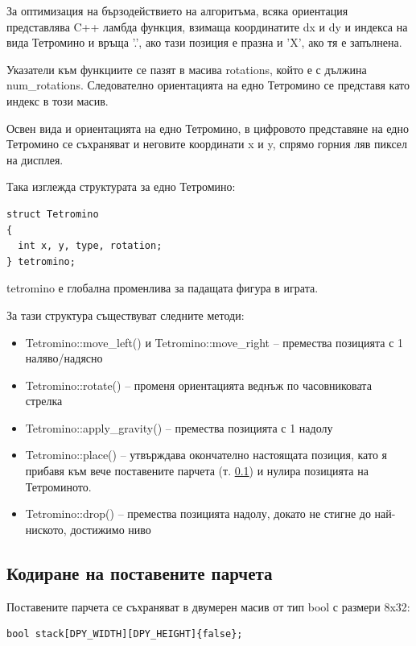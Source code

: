 \documentclass[titlepage, oneside, 14pt]{extbook}
\renewcommand{\texttt}[1]{{\small\ttfamily #1}}
\begin{document}
За оптимизация на бързодействието на алгоритъма, всяка ориентация представлява C++ ламбда функция, взимаща
координатите \texttt{dx} и \texttt{dy} и индекса на вида Тетромино и връща \texttt{'.'}, ако тази позиция е празна
и \texttt{'X'}, ако тя е запълнена.

Указатели към функциите се пазят в масива \texttt{rotations}, който е с дължина \texttt{num_rotations}. Следователно
ориентацията на едно Тетромино се представя като индекс в този масив.

Освен вида и ориентацията на едно Тетромино, в цифровото представяне на едно Тетромино се съхраняват и неговите
координати \texttt{x} и \texttt{y}, спрямо горния ляв пиксел на дисплея.

Така изглежда структурата за едно Тетромино:

\begin{verbatim}
struct Tetromino
{
  int x, y, type, rotation;
} tetromino;
\end{verbatim}

\texttt{tetromino} е глобална променлива за падащата фигура в играта.

За тази структура съществуват следните методи:

\begin{itemize}
  \item \texttt{Tetromino::move_left()} и \texttt{Tetromino::move_right} -- премества позицията с 1 наляво/надясно
  \item \texttt{Tetromino::rotate()} -- променя ориентацията веднъж по часовниковата стрелка
  \item \texttt{Tetromino::apply_gravity()} -- премества позицията с 1 надолу
  \item \texttt{Tetromino::place()} -- утвърждава окончателно настоящата
    позиция, като я прибавя към вече поставените парчета (т. \ref{stack}) и нулира позицията на Тетроминото.
  \item \texttt{Tetromino::drop()} -- премества позицията надолу, докато не стигне до най-ниското, достижимо ниво
\end{itemize}

\subsection{Кодиране на поставените парчета}
\label{stack}

Поставените парчета се съхраняват в двумерен масив от тип \texttt{bool} с размери 8x32:

\begin{verbatim}
bool stack[DPY_WIDTH][DPY_HEIGHT]{false};
\end{verbatim}
\end{document}
